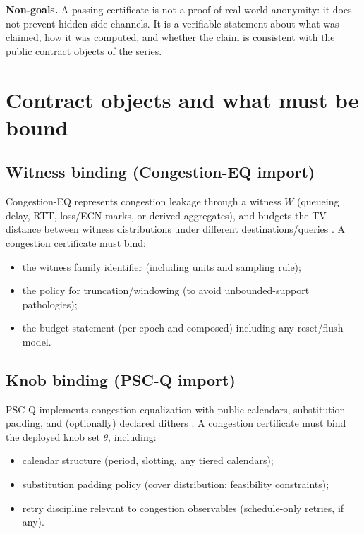 \documentclass[11pt]{article}
\begin{document}
\textbf{Non-goals.}
A passing certificate is not a proof of real-world anonymity: it does not prevent hidden side channels.
It is a verifiable statement about what was claimed, how it was computed, and whether the claim is consistent with the public contract objects of the series.

\section{Contract objects and what must be bound}
\subsection{Witness binding (Congestion-EQ import)}
Congestion-EQ represents congestion leakage through a witness $W$ (queueing delay, RTT, loss/ECN marks, or derived aggregates), and budgets the TV distance between witness distributions under different destinations/queries \cite{series:congeq}.
A congestion certificate must bind:
\begin{itemize}[leftmargin=1.2em]
\item the witness family identifier (including units and sampling rule);
\item the policy for truncation/windowing (to avoid unbounded-support pathologies);
\item the budget statement (per epoch and composed) including any reset/flush model.
\end{itemize}

\subsection{Knob binding (PSC-Q import)}
PSC-Q implements congestion equalization with public calendars, substitution padding, and (optionally) declared dithers \cite{series:pscq}.
A congestion certificate must bind the deployed knob set $\theta$, including:
\begin{itemize}[leftmargin=1.2em]
\item calendar structure (period, slotting, any tiered calendars);
\item substitution padding policy (cover distribution; feasibility constraints);
\item retry discipline relevant to congestion observables (schedule-only retries, if any).
\end{itemize}
\end{document}
